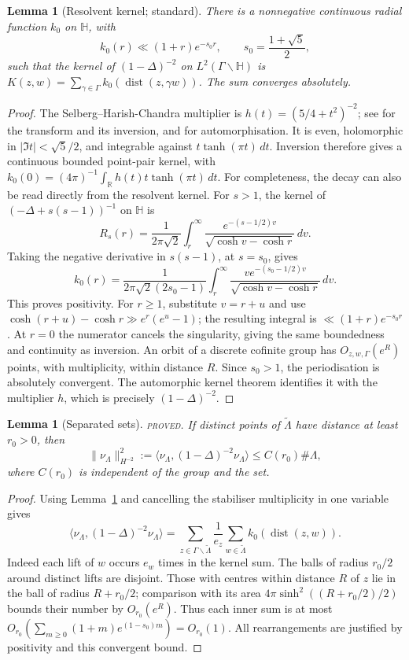 \documentclass[10pt,reqno]{amsart}
\newtheorem{lemma}[theorem]{Lemma}
\theoremstyle{definition}
\numberwithin{equation}{section}
\newcommand{\R}{\mathbb R}
\newcommand{\HH}{\mathbb H}
\newcommand{\status}[1]{\textup{\textsc{#1}}}
\begin{document}
\begin{lemma}[Resolvent kernel; standard]\label{L:4.1}
There is a nonnegative continuous radial function $k_0$ on $\HH$, with
\[
 k_0(r)\ll(1+r)e^{-s_0r},\qquad s_0=\frac{1+\sqrt5}{2},
\]
such that the kernel of $(1-\Delta)^{-2}$ on
$L^2(\Gamma\backslash\HH)$ is
$K(z,w)=\sum_{\gamma\in\Gamma}k_0(\operatorname{dist}(z,\gamma w))$.
The sum converges absolutely.
\end{lemma}
\begin{proof}
The Selberg--Harish-Chandra multiplier is
\(h(t)=(5/4+t^2)^{-2}\); see \cite[\S1.8]{Iw} for the transform and its
inversion, and \cite[Theorem 1.14]{Iw} for automorphisation.
It is even, holomorphic in \(|\Im t|<\sqrt5/2\), and integrable against
\(t\tanh(\pi t)\,dt\). Inversion therefore gives a continuous bounded
point-pair kernel, with
$k_0(0)=(4\pi)^{-1}\int_{\R}h(t)t\tanh(\pi t)\,dt$.
For completeness, the decay can also be read directly from the resolvent
kernel. For \(s>1\), the kernel of \((-\Delta+s(s-1))^{-1}\) on \(\HH\) is
\[
 R_s(r)=\frac1{2\pi\sqrt2}\int_r^\infty
       \frac{e^{-(s-1/2)v}}{\sqrt{\cosh v-\cosh r}}\,dv.
\]
Taking the negative derivative in $s(s-1)$, at $s=s_0$, gives
\[
 k_0(r)=\frac1{2\pi\sqrt2(2s_0-1)}
       \int_r^\infty\frac{v e^{-(s_0-1/2)v}}
                            {\sqrt{\cosh v-\cosh r}}\,dv.
\]
This proves positivity. For \(r\ge1\), substitute \(v=r+u\) and use
\(\cosh(r+u)-\cosh r\gg e^r(e^u-1)\); the resulting integral is
$\ll(1+r)e^{-s_0r}$. At \(r=0\) the numerator cancels the
singularity, giving the same boundedness and continuity as inversion.
An orbit of a discrete cofinite group has \(O_{z,w,\Gamma}(e^R)\) points,
with multiplicity, within distance $R$. Since $s_0>1$, the
periodisation is absolutely convergent. The automorphic kernel theorem
identifies it with the multiplier \(h\), which is precisely
\((1-\Delta)^{-2}\).
\end{proof}

\begin{lemma}[Separated sets]\label{L:4.2}
\status{proved}. If distinct points of \(\widetilde\Lambda\) have distance
at least \(r_0>0\), then
\[
 \|\nu_\Lambda\|_{H^{-2}}^2
 :=\langle\nu_\Lambda,(1-\Delta)^{-2}\nu_\Lambda\rangle
 \le C(r_0)\#\Lambda,
\]
where \(C(r_0)\) is independent of the group and the set.
\end{lemma}
\begin{proof}
Using Lemma~\ref{L:4.1} and cancelling the stabiliser multiplicity in
one variable gives
\[
 \langle\nu_\Lambda,(1-\Delta)^{-2}\nu_\Lambda\rangle
 =\sum_{z\in\Gamma\backslash\widetilde\Lambda}\frac1{e_z}
       \sum_{w\in\widetilde\Lambda}k_0(\operatorname{dist}(z,w)).
\]
Indeed each lift of \(w\) occurs \(e_w\) times in the kernel sum.
The balls of radius \(r_0/2\) around distinct lifts are disjoint.
Those with centres within distance \(R\) of \(z\) lie in the ball of
radius \(R+r_0/2\); comparison with its area
\(4\pi\sinh^2((R+r_0/2)/2)\) bounds their number by \(O_{r_0}(e^R)\).
Thus each inner sum is at most
$O_{r_0}(\sum_{m\ge0}(1+m)e^{(1-s_0)m})=O_{r_0}(1)$.
All rearrangements are justified by positivity and this convergent bound.
\end{proof}
\end{document}
